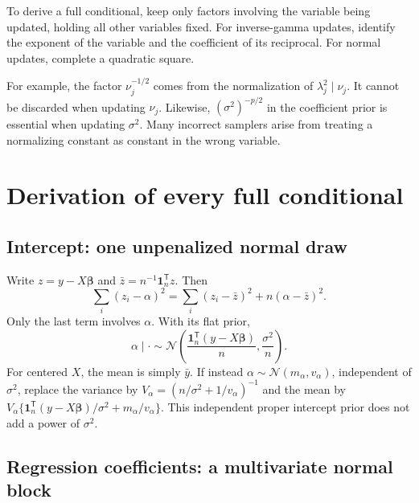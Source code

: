 \documentclass[11pt,letterpaper]{article}
\numberwithin{equation}{section}
\newcommand{\Normal}{\mathcal{N}}
\newcommand{\given}{\mid}
\newcommand{\bbeta}{\bm{\beta}}
\newcommand{\ones}{\mathbf{1}}
\newcommand{\trans}{^{\mathsf T}}
\begin{document}
To derive a full conditional, keep only factors involving the variable being
updated, holding all other variables fixed. For inverse-gamma updates,
identify the exponent of the variable and the coefficient of its reciprocal.
For normal updates, complete a quadratic square.

For example, the factor \(\nu_j^{-1/2}\) comes from the normalization of
\(\lambda_j^2\given\nu_j\). It cannot be discarded when updating \(\nu_j\).
Likewise, \((\sigma^2)^{-p/2}\) in the coefficient prior is essential when
updating \(\sigma^2\). Many incorrect samplers arise from treating a
normalizing constant as constant in the wrong variable.

\section{Derivation of every full conditional}\label{sec:conditionals}

\subsection{Intercept: one unpenalized normal draw}\label{sec:alpha}

Write \(z=y-X\bbeta\) and \(\bar z=n^{-1}\ones_n\trans z\). Then
\[
 \sum_i(z_i-\alpha)^2
 =\sum_i(z_i-\bar z)^2+n(\alpha-\bar z)^2.
\]
Only the last term involves \(\alpha\). With its flat prior,
\begin{equation}\label{eq:alpha}
 \boxed{\alpha\given\cdot\sim\Normal\left(
       \frac{\ones_n\trans(y-X\bbeta)}{n},\frac{\sigma^2}{n}\right).}
\end{equation}
For centered \(X\), the mean is simply \(\bar y\). If instead
\(\alpha\sim\Normal(m_\alpha,v_\alpha)\), independent of \(\sigma^2\), replace
the variance by \(V_\alpha=(n/\sigma^2+1/v_\alpha)^{-1}\) and the mean by
\(V_\alpha\{\ones_n\trans(y-X\bbeta)/\sigma^2+m_\alpha/v_\alpha\}\).
This independent proper intercept prior does not add a power of \(\sigma^2\).

\subsection{Regression coefficients: a multivariate normal block}
\end{document}
